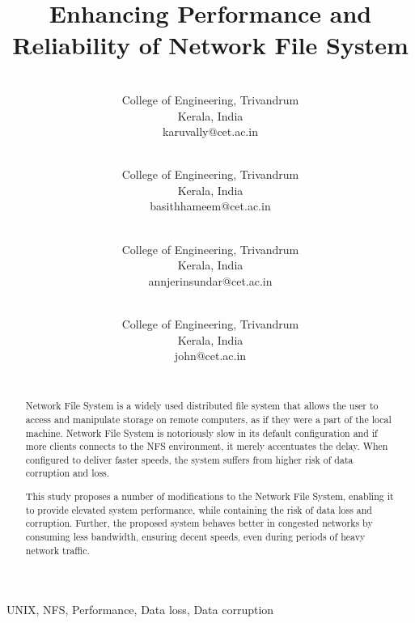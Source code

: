 \documentclass[conference]{IEEEtran}
\begin{document}
\title{Enhancing Performance and Reliability of Network File System\\
}

\author{
\\
College of Engineering, Trivandrum \\
Kerala, India  \\
karuvally@cet.ac.in\\
\and {}\\
College of Engineering, Trivandrum \\
Kerala, India  \\
basithhameem@cet.ac.in\\
\and {}\\
College of Engineering, Trivandrum \\
Kerala, India  \\
annjerinsundar@cet.ac.in\\
\and {}\\
College of Engineering, Trivandrum \\
Kerala, India  \\
john@cet.ac.in\\
\\
}
\maketitle

\begin{abstract}
Network File System is a widely used distributed file system that allows the
user to access and manipulate storage on remote computers, as if they were a
part of the local machine. Network File System is notoriously slow in its 
default configuration and if more clients connects to the NFS environment,
it merely accentuates the delay. When configured to deliver faster speeds,
the system suffers from higher risk of data corruption and loss.

This study proposes a number of modifications to the Network File System,
enabling it to provide elevated system performance, while containing
the risk of data loss and corruption. Further, the proposed system behaves
better in congested networks by consuming less bandwidth, ensuring decent
speeds, even during periods of heavy network traffic.
\end{abstract}

\begin{IEEEkeywords}
UNIX,
NFS,
Performance,
Data loss,
Data corruption
\end{IEEEkeywords}
\end{document}

